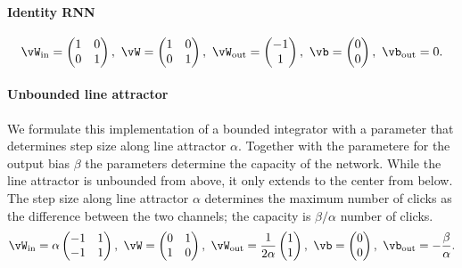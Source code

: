 \documentclass{article} %
\newcounter{ct}
\newcommand{\win}{\vW_{\text{in}}}
\newcommand{\wout}{\vW_{\text{out}}}
\newcommand{\bout}{\vb_{\text{out}}}
\theoremstyle{definition}
\theoremstyle{remark}
\begin{document}
\paragraph{Identity RNN~\citep{le2015}}
\label{sec:ubpa,sec:iRNN}
\begin{equation}\label{eq:irnn}
\win = 
\begin{pmatrix}
1  &  0 \\
0 &  1
\end{pmatrix}, \
\vW = 
\begin{pmatrix}
1  &  0 \\
0  &  1
\end{pmatrix}, \
\wout = 
\begin{pmatrix}
-1  \\  1 
\end{pmatrix}, \
\vb = 
\begin{pmatrix}
0  \\ 0
\end{pmatrix}, \
\bout = 0.
\end{equation}


\paragraph{Unbounded line attractor}
We formulate this implementation of a bounded integrator with a parameter that determines step size along line attractor $\alpha$. Together with the parametere for the output bias $\beta$ the parameters determine the capacity of the network. While the line attractor is unbounded from above, it only extends to the center from below.  The step size along line attractor $\alpha$ determines the maximum number of clicks as the difference between the two channels; the capacity is $\beta/\alpha$ number of clicks.
\label{sec:ubla}
\begin{equation}\label{eq:ubla}
\win = \alpha
\begin{pmatrix}
-1  &  1 \\
-1  &  1
\end{pmatrix}, \
\vW = 
\begin{pmatrix}
0  &  1 \\
1  &  0
\end{pmatrix}, \
\wout = \frac{1}{2\alpha}
\begin{pmatrix}
1  \\  1 
\end{pmatrix}, \
\vb = 
\begin{pmatrix}
0  \\  0
\end{pmatrix}, \
\bout = -\frac{\beta}{\alpha}.
\end{equation}
\end{document}
